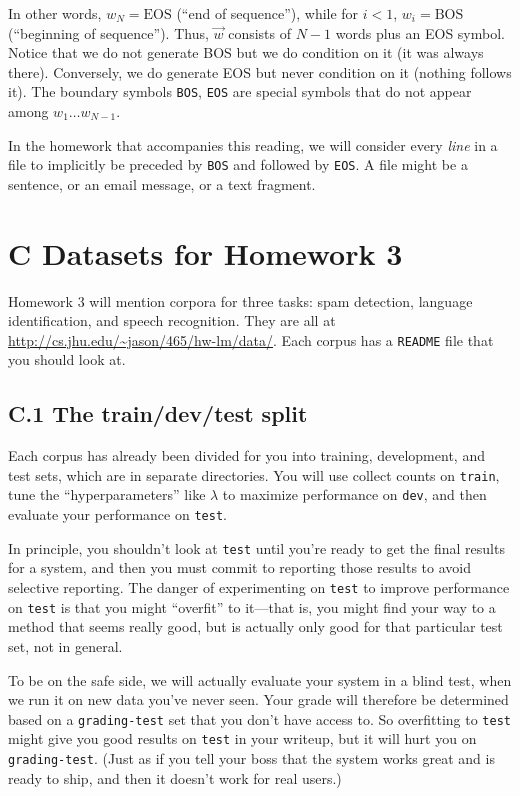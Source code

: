In other words, $w_N = \text{EOS}$ (“end of sequence”), while for $i < 1$, $w_i = \text{BOS}$ (“beginning of sequence”). Thus, $\vec{w}$ consists of $N-1$ words plus an EOS symbol. Notice that we do not generate BOS but we do condition on it (it was always there). Conversely, we do generate EOS but never condition on it (nothing follows it). The boundary symbols \texttt{BOS}, \texttt{EOS} are special symbols that do not appear among $w_1 \ldots w_{N-1}$.

In the homework that accompanies this reading, we will consider every \textit{line} in a file to implicitly be preceded by \texttt{BOS} and followed by \texttt{EOS}. A file might be a sentence, or an email message, or a text fragment.

\section*{C Datasets for Homework 3}
Homework 3 will mention corpora for three tasks: spam detection, language identification, and speech recognition. They are all at \url{http://cs.jhu.edu/~jason/465/hw-lm/data/}. Each corpus has a \texttt{README} file that you should look at.

\subsection*{C.1 The train/dev/test split}
Each corpus has already been divided for you into training, development, and test sets, which are in separate directories. You will use collect counts on \texttt{train}, tune the “hyperparameters” like $\lambda$ to maximize performance on \texttt{dev}, and then evaluate your performance on \texttt{test}.

In principle, you shouldn’t look at \texttt{test} until you’re ready to get the final results for a system, and then you must commit to reporting those results to avoid selective reporting. The danger of experimenting on \texttt{test} to improve performance on \texttt{test} is that you might “overfit” to it—that is, you might find your way to a method that seems really good, but is actually only good for that particular test set, not in general.

To be on the safe side, we will actually evaluate your system in a blind test, when we run it on new data you’ve never seen. Your grade will therefore be determined based on a \texttt{grading-test} set that you don’t have access to. So overfitting to \texttt{test} might give you good results on \texttt{test} in your writeup, but it will hurt you on \texttt{grading-test}. (Just as if you tell your boss that the system works great and is ready to ship, and then it doesn’t work for real users.)

